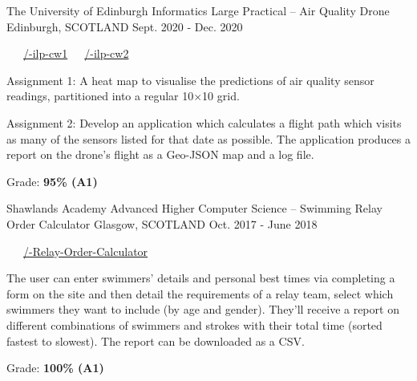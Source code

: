 \begin{cventries}
  \cventry
    {The University of Edinburgh} %
    {Informatics Large Practical -- Air Quality Drone} %
    {Edinburgh, SCOTLAND} %
    {Sept. 2020 - Dec. 2020} %
    {
      \color{awesome} \color{graytext}\ \ \ \href{https://github.com/chrisjpm/inf3-ilp-cw1}{\faGithub\acvHeaderIconSep\@chrisjpm/-ilp-cw1}\ \ \ \href{https://github.com/chrisjpm/inf3-ilp-cw2}{\faGithub\acvHeaderIconSep\@chrisjpm/-ilp-cw2}
      \vspace{1.6em}
      \begin{cvitems} %
        \item Assignment 1: A heat map to visualise the predictions of air quality sensor readings, partitioned into a regular 10×10 grid.
        \item Assignment 2: Develop an application which calculates a flight path which visits as many of the sensors listed for that date as possible. The application produces a report on the drone’s flight as a Geo-JSON map and a log file.
        \item Grade: \textbf{95\% (A1)}
      \end{cvitems}
    }
  \cventry
    {Shawlands Academy} %
    {Advanced Higher Computer Science -- Swimming Relay Order Calculator} %
    {Glasgow, SCOTLAND} %
    {Oct. 2017 - June 2018} %
    {
      \color{awesome}        \color{graytext}\ \ \ \href{https://github.com/chrisjpm/Swimming-Relay-Order-Calculator}{\faGithub\acvHeaderIconSep\@chrisjpm/\@Swimming-Relay-Order-Calculator}\ \ \ \href{https://sroc-app.herokuapp.com/}{\faGlobe\acvHeaderIconSep\@Website}
      \vspace{1.6em}
      \begin{cvitems} %
        \item The user can enter swimmers' details and personal best times via completing a form on the site and then detail the requirements of a relay team, select which swimmers they want to include (by age and gender). They'll receive a report on different combinations of swimmers and strokes with their total time (sorted fastest to slowest). The report can be downloaded as a CSV.
        \item Grade: \textbf{100\% (A1)}
      \end{cvitems}
    }
\end{cventries}
\vspace{-.5em}
